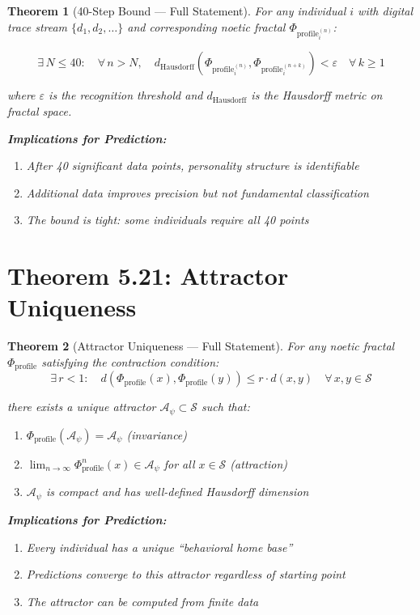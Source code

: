 \documentclass[11pt,twoside]{book}
\newcommand{\PsychAttractor}{\mathcal{A}_\psi}
\newcommand{\ProfileFrac}{\Phi_{\mathrm{profile}}}
\newtheorem{theorem}{Theorem}[chapter]
\begin{document}
\begin{theorem}[40-Step Bound --- Full Statement]
\label{thm:40-step-full}
For any individual $i$ with digital trace stream $\{d_1, d_2, \ldots\}$ and corresponding noetic fractal $\ProfileFrac_i^{(n)}$:

\[
    \exists\, N \leq 40 : \quad \forall\, n > N, \quad
    d_{\mathrm{Hausdorff}}\left( \ProfileFrac_i^{(n)}, \ProfileFrac_i^{(n+k)} \right) < \varepsilon
    \quad \forall\, k \geq 1
\]

where $\varepsilon$ is the recognition threshold and $d_{\mathrm{Hausdorff}}$ is the Hausdorff metric on fractal space.

\textbf{Implications for Prediction:}
\begin{enumerate}
    \item After 40 significant data points, personality structure is identifiable
    \item Additional data improves precision but not fundamental classification
    \item The bound is tight: some individuals require all 40 points
\end{enumerate}
\end{theorem}

\section{Theorem 5.21: Attractor Uniqueness}

\begin{theorem}[Attractor Uniqueness --- Full Statement]
\label{thm:attractor-unique-full}
For any noetic fractal $\ProfileFrac$ satisfying the contraction condition:
\[
    \exists\, r < 1 : \quad d(\ProfileFrac(x), \ProfileFrac(y)) \leq r \cdot d(x, y) \quad \forall\, x, y \in \mathcal{S}
\]

there exists a unique attractor $\PsychAttractor \subset \mathcal{S}$ such that:
\begin{enumerate}[label=(\roman*)]
    \item $\ProfileFrac(\PsychAttractor) = \PsychAttractor$ (invariance)
    \item $\lim_{n \to \infty} \ProfileFrac^n(x) \in \PsychAttractor$ for all $x \in \mathcal{S}$ (attraction)
    \item $\PsychAttractor$ is compact and has well-defined Hausdorff dimension
\end{enumerate}

\textbf{Implications for Prediction:}
\begin{enumerate}
    \item Every individual has a unique ``behavioral home base''
    \item Predictions converge to this attractor regardless of starting point
    \item The attractor can be computed from finite data
\end{enumerate}
\end{theorem}
\end{document}
